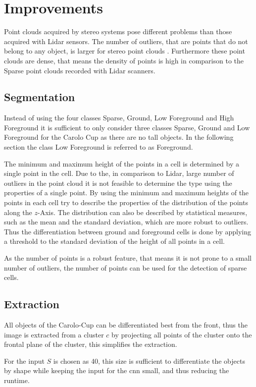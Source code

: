 \section{Improvements}
Point clouds acquired by stereo systems pose different problems than those acquired with Lidar sensors. 
The number of outliers, that are points that do not belong to any object, is larger for stereo point clouds \cite{Wang19}. 
Furthermore these point clouds are dense, that means the density of points is high in comparison to the Sparse point clouds recorded with Lidar scanners.

\subsection{Segmentation}
Instead of using the four classes Sparse, Ground, Low Foreground and High Foreground it is sufficient to only consider three classes Sparse, Ground and Low Foreground for the Carolo Cup as there are no tall objects. In the following section the class Low Foreground is referred to as Foreground.

The minimum and maximum height of the points in a cell is determined by a single point in the cell. 
Due to the, in comparison to Lidar, large number of outliers in the point cloud it is not feasible to determine the type using the properties of a single point. 
By using the minimum and maximum heights of the points in each cell \cite{AttBen17} try to describe the properties of the distribution of the points along the $z$-Axis.
The distribution can also be described by statistical measures, such as the mean and the standard deviation, which are more robust to outliers. Thus the differentiation between ground and foreground cells is done by applying a threshold to the standard deviation of the height of all points in a cell.

As the number of points is a robust feature, that means it is not prone to a small number of outliers, the number of points can be used for the detection of sparse cells.

\subsection{Extraction}
All objects of the Carolo-Cup can be differentiated best from the front,
thus the image is extracted from a cluster $c$ by projecting all points of the cluster onto the frontal plane of the cluster, this simplifies the extraction.

For the input $S$ is chosen as 40, this size is sufficient to differentiate the objects by shape while keeping the input for the \ac{cnn} small, and thus reducing the runtime.

